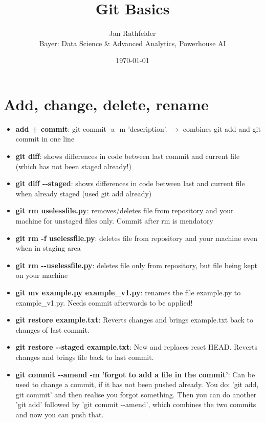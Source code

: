 \documentclass[12pt]{article}
\begin{document}
\title{\textbf{Git Basics}}
\date{\today}
\author{Jan Rathfelder\\ Bayer: Data Science \& Advanced Analytics, Powerhouse AI}    
\maketitle  
\newpage

\tableofcontents
\newpage

\setcounter{page}{0}
\section{Add, change, delete, rename}
\begin {itemize}
\item \textbf{add + commit}: git commit -a -m 'description'. $\rightarrow$ combines git add and git commit in one line
\item \textbf{git diff}: shows differences in code between last commit and current file (which has not been staged already!)
\item \textbf{git diff \textrm{-}\textrm{-}staged}: shows differences in code between last and current file when already staged (used git add already)
\item \textbf{git rm uselessfile.py}: removes/deletes file from repository and your machine for unstaged files only. Commit after rm is mendatory
\item \textbf{git rm -f uselessfile.py}: deletes file from repository and your machine even when in staging area
\item \textbf{git rm \textrm{-}\textrm{-}uselessfile.py}: deletes file only from repository, but file being kept on your machine
\item \textbf{git mv example.py example\_v1.py}: renames the file example.py to example\_v1.py. Needs commit afterwards to be applied!
\item \textbf{git restore example.txt}: Reverts changes and brings example.txt back to changes of last commit. 
\item \textbf{git restore \textrm{-}\textrm{-}staged example.txt}: New and replaces reset HEAD. Reverts changes and brings file back to last commit.
\item \textbf{git commit \textrm{-}\textrm{-}amend -m 'forgot to add a file in the commit'}: Can be used to change a commit, if it has not been pushed already. You do: 'git add, git commit' and then realise you forgot something. Then you can do another 'git add' followed by 'git commit \textrm{-}\textrm{-}amend', which combines the two commits and now you can push that.
\end{itemize}
\end{document}
